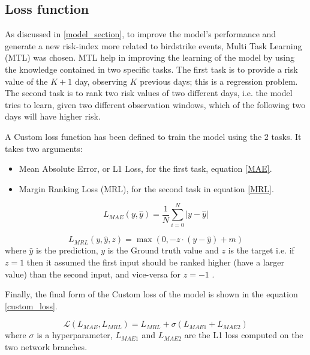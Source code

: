 \subsection{Loss function}\label{Loss_function}
As discussed in \ref{model_section}, to improve the model's performance and generate a new risk-index more related to birdstrike events, Multi Task Learning (MTL) was chosen.
MTL help in improving the learning of the model by using the knowledge contained in two specific tasks.
The first task is to provide a risk value of the $K+1$ day, observing $K$ previous days; this is a regression problem.
The second task is to rank two risk values of two different days, i.e. the model tries to learn, given two different observation windows, which of the following two days will have higher risk.

A Custom loss function has been defined to train the model using the 2 tasks.
It takes two arguments:

\begin{itemize}
    \item Mean Absolute Error, or L1 Loss, for the first task, equation \ref{MAE}.
    \item Margin Ranking Loss (MRL), for the second task in equation \ref{MRL}.
\end{itemize}

\begin{equation}\label{MAE}
L_{MAE}(y, \hat y)=\frac{1}{N}\sum_{i=0}^N |y - \hat y|
\end{equation}

\begin{equation}\label{MRL}
L_{MRL}(y, \hat y, z) = \max(0, -z \cdot (y - \hat y) + m)
\end{equation}
where $\hat y$ is the prediction, $y$ is the Ground truth value and $z$ is the target i.e. if $z=1$ then it assumed the first input should be ranked higher (have a larger value) than the second input, and vice-versa for $z=-1$ .

Finally, the final form of the Custom loss of the model is shown in the equation \ref{custom_loss}.

\begin{equation}\label{custom_loss}
\mathcal{L}(L_{MAE}, L_{MRL})= L_{MRL} + \sigma(L_{MAE1} + L_{MAE2})
\end{equation}
where $\sigma$ is a hyperparameter, $L_{MAE1}$ and $L_{MAE2}$ are the L1 loss computed on the two network branches.

